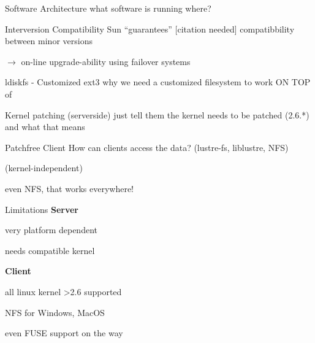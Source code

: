 \begin{frame}{Software Architecture}
    what software is running where?
\end{frame}

\begin{frame}{Interversion Compatibility}
    Sun ``guarantees'' [citation needed] compatibbility between
    minor versions

    $\rightarrow$ on-line upgrade-ability using failover systems
\end{frame}

\begin{frame}{ldiskfs - Customized ext3}
    why we need a customized filesystem to work ON TOP of
\end{frame}

\begin{frame}{Kernel patching (serverside)}
    just tell them the kernel needs to be patched (2.6.*) and what that means
\end{frame}

\begin{frame}{Patchfree Client}
    How can clients access the data? (lustre-fs, liblustre, NFS)

    (kernel-independent)

    even NFS, that works everywhere!
\end{frame}

\begin{frame}{Limitations}
    \textbf{Server}

    very platform dependent

    needs compatible kernel

    \textbf{Client}

    all linux kernel \textgreater2.6 supported

    NFS for Windows, MacOS

    even FUSE support on the way
\end{frame}
